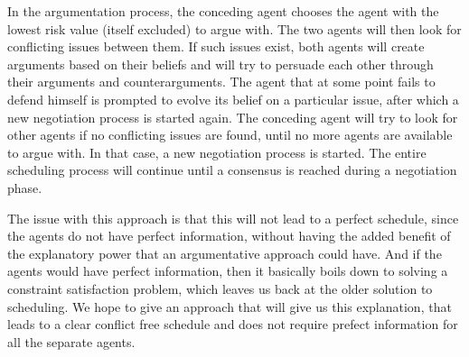 In the argumentation process, the conceding agent chooses the agent with 
the lowest risk value (itself excluded) to argue with. The two agents will
then look for conflicting issues between them. If such issues exist, both
agents will create arguments based on their beliefs and will try to
persuade each other through their arguments and counterarguments. The agent
that at some point fails to defend himself is prompted to evolve its belief
on a particular issue, after which a new negotiation process is started
again. The conceding agent will try to look for other agents if no
conflicting issues are found, until no more agents are available to argue
with. In that case, a new negotiation process is started. The entire
scheduling process will continue until a consensus is reached during a
negotiation phase.

The issue with this approach is that this will not lead to a perfect
schedule, since the agents do not have perfect information, without having
the added benefit of the explanatory power that an argumentative approach
could have. And if the agents would have perfect information, then it
basically boils down to solving a constraint satisfaction problem, which
leaves us back at the older solution to scheduling. We hope to give an
approach that will give us this explanation, that leads to a clear conflict
free schedule and does not require prefect information for all the separate
agents.
